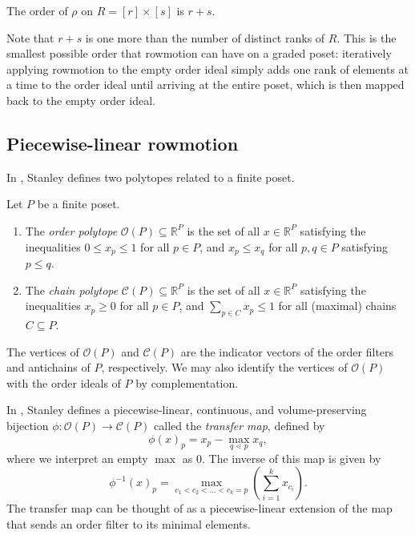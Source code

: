 \documentclass[ALCO,Unicode,published]{cedram}
\numberwithin{equation}{section}
\newcommand{\op}{\mathcal{O}(P)}
\newcommand{\cp}{\mathcal{C}(P)}
\begin{document}
\begin{Th}
The order of $\rho$ on $R=[r] \times [s]$ is $r+s$.
\end{Th}

Note that $r+s$ is one more than the number of distinct ranks of $R$. This is the smallest possible order that rowmotion can have on a graded poset: iteratively applying rowmotion to the empty order ideal simply adds one rank of elements at a time to the order ideal until arriving at the entire poset, which is then mapped back to the empty order ideal.

\subsection{Piecewise-linear rowmotion}

In \cite{stanley2}, Stanley defines two polytopes related to a finite poset.

\begin{Def}
Let $P$ be a finite poset. 

\begin{enumerate}
    \item The \emph{order polytope} $\op \subseteq \mathbb{R}^P$ is the set of all $x \in \mathbb{R}^P$ satisfying the inequalities $0 \leq x_p \leq 1$ for all $p \in P$, and $x_p \leq x_q$ for all $p,q \in P$ satisfying $p \leq q$.
    \item The \emph{chain polytope} $\cp \subseteq \mathbb{R}^P$ is the set of all $x \in \mathbb{R}^P$ satisfying  the inequalities $x_p \geq 0$ for all $p \in P$, and $\sum_{p \in C} x_p \leq 1$ for all (maximal) chains $C \subseteq P$.
\end{enumerate}
\end{Def}
The vertices of $\op$ and $\cp$ are the indicator vectors of the order filters and antichains of $P$, respectively. We may also identify the vertices of $\op$ with the order ideals of $P$ by complementation.

In \cite{stanley2}, Stanley defines a piecewise-linear, continuous, and volume-preserving bijection $\phi \colon \op \to \cp$ called the \emph{transfer map}, defined by
\[\phi(x)_p = x_p - \max\limits_{q \lessdot p} x_q,\]
where we interpret an empty $\max$ as $0$.
The inverse of this map is given by
\[\phi^{-1}(x)_p = \max\limits_{c_1 < c_2 < \dots < c_k = p} \left( \sum\limits_{i=1}^k x_{c_i} \right).\]
The transfer map can be thought of as a piecewise-linear extension of the map that sends an order filter to its minimal elements.
\end{document}
